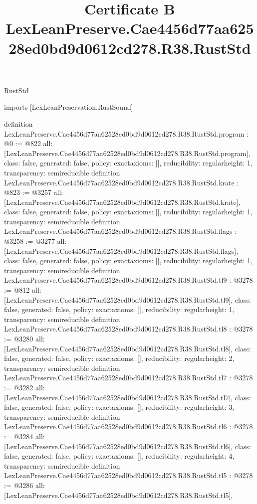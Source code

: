 \begin{lexlean}{RustStd}
\title{Certificate B LexLeanPreserve.Cae4456d77aa62528ed0bd9d0612cd278.R38.RustStd}
\begin{coremodule}
imports [LexLeanPreservation.RustSound]

definition LexLeanPreserve.Cae4456d77aa62528ed0bd9d0612cd278.R38.RustStd.program : @0 := @822 {
  all: [LexLeanPreserve.Cae4456d77aa62528ed0bd9d0612cd278.R38.RustStd.program],
  class: false,
  generated: false,
  policy: exact{axioms: []},
  reducibility: regular{height: 1},
  transparency: semireducible
}
definition LexLeanPreserve.Cae4456d77aa62528ed0bd9d0612cd278.R38.RustStd.krate : @823 := @3257 {
  all: [LexLeanPreserve.Cae4456d77aa62528ed0bd9d0612cd278.R38.RustStd.krate],
  class: false,
  generated: false,
  policy: exact{axioms: []},
  reducibility: regular{height: 1},
  transparency: semireducible
}
definition LexLeanPreserve.Cae4456d77aa62528ed0bd9d0612cd278.R38.RustStd.flags : @3258 := @3277 {
  all: [LexLeanPreserve.Cae4456d77aa62528ed0bd9d0612cd278.R38.RustStd.flags],
  class: false,
  generated: false,
  policy: exact{axioms: []},
  reducibility: regular{height: 1},
  transparency: semireducible
}
definition LexLeanPreserve.Cae4456d77aa62528ed0bd9d0612cd278.R38.RustStd.tl9 : @3278 := @812 {
  all: [LexLeanPreserve.Cae4456d77aa62528ed0bd9d0612cd278.R38.RustStd.tl9],
  class: false,
  generated: false,
  policy: exact{axioms: []},
  reducibility: regular{height: 1},
  transparency: semireducible
}
definition LexLeanPreserve.Cae4456d77aa62528ed0bd9d0612cd278.R38.RustStd.tl8 : @3278 := @3280 {
  all: [LexLeanPreserve.Cae4456d77aa62528ed0bd9d0612cd278.R38.RustStd.tl8],
  class: false,
  generated: false,
  policy: exact{axioms: []},
  reducibility: regular{height: 2},
  transparency: semireducible
}
definition LexLeanPreserve.Cae4456d77aa62528ed0bd9d0612cd278.R38.RustStd.tl7 : @3278 := @3282 {
  all: [LexLeanPreserve.Cae4456d77aa62528ed0bd9d0612cd278.R38.RustStd.tl7],
  class: false,
  generated: false,
  policy: exact{axioms: []},
  reducibility: regular{height: 3},
  transparency: semireducible
}
definition LexLeanPreserve.Cae4456d77aa62528ed0bd9d0612cd278.R38.RustStd.tl6 : @3278 := @3284 {
  all: [LexLeanPreserve.Cae4456d77aa62528ed0bd9d0612cd278.R38.RustStd.tl6],
  class: false,
  generated: false,
  policy: exact{axioms: []},
  reducibility: regular{height: 4},
  transparency: semireducible
}
definition LexLeanPreserve.Cae4456d77aa62528ed0bd9d0612cd278.R38.RustStd.tl5 : @3278 := @3286 {
  all: [LexLeanPreserve.Cae4456d77aa62528ed0bd9d0612cd278.R38.RustStd.tl5],
}
\end{coremodule}
\end{lexlean}
